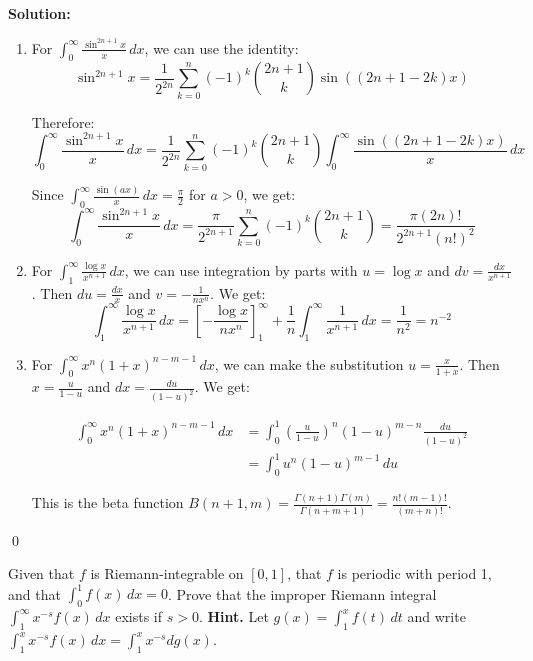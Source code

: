\bigskip\noindent\textbf{Solution:}
\begin{enumerate}[label=(\alph*)]
\item For $\int_{0}^{\infty} \frac{\sin^{2n+1} x}{x} \, dx$, we can use the identity:
\[\sin^{2n+1} x = \frac{1}{2^{2n}} \sum_{k=0}^{n} (-1)^k \binom{2n+1}{k} \sin((2n+1-2k)x)\]

Therefore:
\[\int_{0}^{\infty} \frac{\sin^{2n+1} x}{x} \, dx = \frac{1}{2^{2n}} \sum_{k=0}^{n} (-1)^k \binom{2n+1}{k} \int_{0}^{\infty} \frac{\sin((2n+1-2k)x)}{x} \, dx\]

Since $\int_{0}^{\infty} \frac{\sin(ax)}{x} \, dx = \frac{\pi}{2}$ for $a > 0$, we get:
\[\int_{0}^{\infty} \frac{\sin^{2n+1} x}{x} \, dx = \frac{\pi}{2^{2n+1}} \sum_{k=0}^{n} (-1)^k \binom{2n+1}{k} = \frac{\pi(2n)!}{2^{2n+1}(n!)^2}\]

\item For $\int_{1}^{\infty} \frac{\log x}{x^{n+1}} \, dx$, we can use integration by parts with $u = \log x$ and $dv = \frac{dx}{x^{n+1}}$. Then $du = \frac{dx}{x}$ and $v = -\frac{1}{nx^n}$. We get:
\[\int_{1}^{\infty} \frac{\log x}{x^{n+1}} \, dx = \left[-\frac{\log x}{nx^n}\right]_{1}^{\infty} + \frac{1}{n} \int_{1}^{\infty} \frac{1}{x^{n+1}} \, dx = \frac{1}{n^2} = n^{-2}\]

\item For $\int_{0}^{\infty} x^n (1 + x)^{n-m-1} \, dx$, we can make the substitution $u = \frac{x}{1+x}$. Then $x = \frac{u}{1-u}$ and $dx = \frac{du}{(1-u)^2}$. We get:

\begin{align*}
\int_{0}^{\infty} x^n (1 + x)^{n-m-1} \, dx &= \int_{0}^{1} \left(\frac{u}{1-u}\right)^n (1-u)^{m-n} \frac{du}{(1-u)^2} \\
&= \int_{0}^{1} u^n (1-u)^{m-1} \, du
\end{align*}

This is the beta function $B(n+1, m) = \frac{\Gamma(n+1)\Gamma(m)}{\Gamma(n+m+1)} = \frac{n!(m-1)!}{(m+n)!}$.
\end{enumerate}\qed


\begin{problembox}
\begin{problemstatement}
Given that $f$ is Riemann-integrable on $[0, 1]$, that $f$ is periodic with period 1, and that $\int_{0}^{1} f(x) \, dx = 0$. Prove that the improper Riemann integral $\int_{1}^{\infty} x^{-s} f(x) \, dx$ exists if $s > 0$. \textbf{Hint.} Let $g(x) = \int_{1}^{x} f(t) \, dt$ and write $\int_{1}^{x} x^{-s} f(x) \, dx = \int_{1}^{x} x^{-s} dg(x)$.
\end{problemstatement}
\end{problembox}

